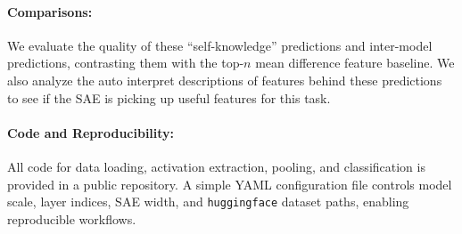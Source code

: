\paragraph{Comparisons:}
We evaluate the quality of these “self-knowledge” predictions and inter-model predictions, contrasting them with the top-$n$ mean difference feature baseline. We also analyze the auto interpret descriptions of features behind these predictions to see if the SAE is picking up useful features for this task. 

\paragraph{Code and Reproducibility:}
All code for data loading, activation extraction, pooling, and classification is provided in a public repository. A simple YAML configuration file controls model scale, layer indices, SAE width, and \texttt{huggingface} dataset paths, enabling reproducible workflows.

